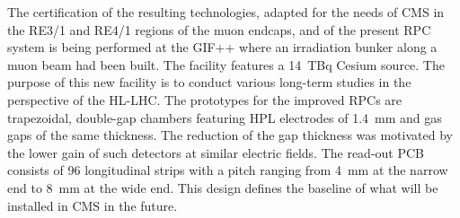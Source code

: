 	The certification of the resulting technologies, adapted for the needs of CMS in the RE3/1 and RE4/1 regions of the muon endcaps, and of the present RPC system is being performed at the \acf{GIF++} where an irradiation bunker along a muon beam had been built. The facility features a \SI{14}{TBq} Cesium source. The purpose of this new facility is to conduct various long-term studies in the perspective of the HL-LHC. The prototypes for the improved RPCs are trapezoidal, double-gap chambers featuring \acf{HPL} electrodes of \SI{1.4}{mm} and gas gaps of the same thickness. The reduction of the gap thickness was motivated by the lower gain of such detectors at similar electric fields. The read-out PCB consists of 96 longitudinal strips with a pitch ranging from \SI{4}{mm} at the narrow end to \SI{8}{mm} at the wide end. This design defines the baseline of what will be installed in CMS in the future.\vspace{5mm}
	
